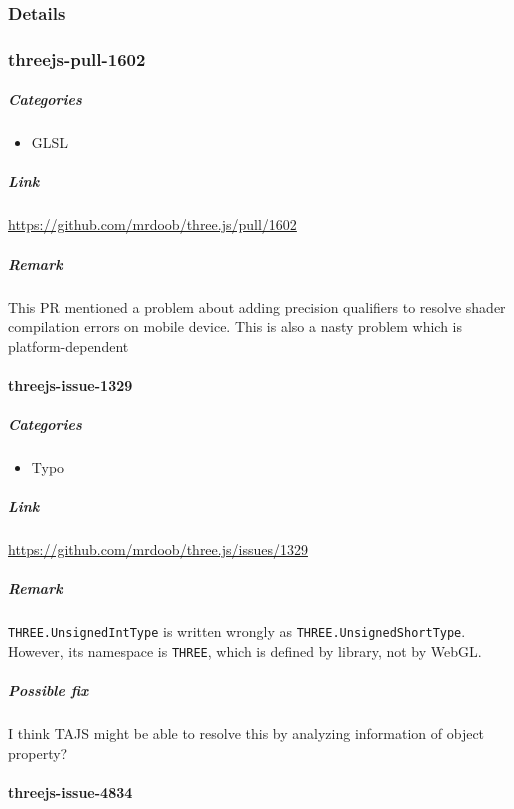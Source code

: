 \documentclass[]{article}
\begin{document}
\subsubsection{Details}\label{details}
\subsubsection{threejs-pull-1602}\label{threejs-pull-1602}

\subparagraph{Categories}\label{categories}

\begin{itemize}
\itemsep1pt\parskip0pt
\item
  GLSL
\end{itemize}

\subparagraph{Link}\label{link}

\url{https://github.com/mrdoob/three.js/pull/1602}

\subparagraph{Remark}\label{remark}

This PR mentioned a problem about adding precision qualifiers to resolve
shader compilation errors on mobile device. This is also a nasty problem
which is platform-dependent

\paragraph{threejs-issue-1329}\label{threejs-issue-1329}

\subparagraph{Categories}\label{categories-1}

\begin{itemize}
\itemsep1pt\parskip0pt
\item
  Typo
\end{itemize}

\subparagraph{Link}\label{link-1}

\url{https://github.com/mrdoob/three.js/issues/1329}

\subparagraph{Remark}\label{remark-1}

\texttt{THREE.UnsignedIntType} is written wrongly as
\texttt{THREE.UnsignedShortType}. However, its namespace is
\texttt{THREE}, which is defined by library, not by WebGL.

\subparagraph{Possible fix}\label{possible-fix}

I think TAJS might be able to resolve this by analyzing information of
object property?

\paragraph{threejs-issue-4834}\label{threejs-issue-4834}
\end{document}
